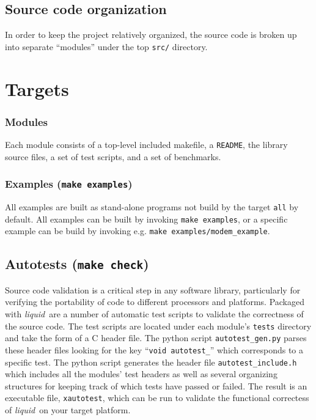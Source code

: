 \documentclass[11pt,twoside]{report}
\newcommand{\liquid}{{\it liquid}}
\begin{document}
\subsection{Source code organization}
In order to keep the project relatively organized, the source code is broken
up into separate ``modules'' under the top {\tt src/} directory.

\section{Targets}
\label{ch:installation:targets}

\subsubsection{Modules}
Each module consists of a top-level included makefile, a {\tt README}, the
library source files, a set of test scripts, and a set of benchmarks.

\subsubsection{Examples ({\tt make examples})}
All examples are built as stand-alone programs not build by the target
{\tt all} by default.
All examples can be built by invoking {\tt make examples}, or a specific
example can be build by invoking e.g. {\tt make examples/modem\_example}.

\subsection{Autotests ({\tt make check})}
\label{ch:installation:targets:autotests}
Source code validation is a critical step in any software library,
particularly for verifying the portability of code to different processors and
platforms.
Packaged with \liquid\ are a number of automatic test scripts to validate the
correctness of the source code.
The test scripts are located under each module's {\tt tests} directory and
take the form of a C header file.
The python script {\tt autotest\_gen.py} parses these header files looking for
the key ``{\tt void autotest\_}'' which corresponds to a specific test.
The python script generates the header file {\tt autotest\_include.h} which
includes all the modules' test headers as well as several organizing
structures for keeping track of which tests have passed or failed.
The result is an executable file, {\tt xautotest}, which can be run to
validate the functional correctess of \liquid\ on your target platform.
\end{document}
